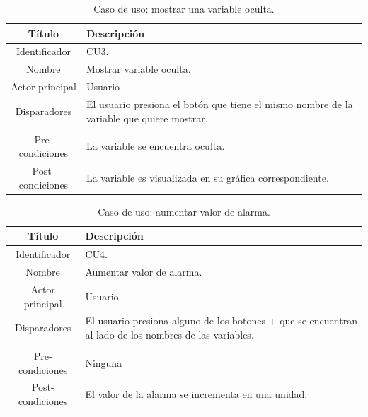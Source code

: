 \begin{table}[htpb]
	\centering
	\caption{Caso de uso: mostrar una variable oculta.}
	\centering
	\begin{tabular}{c p{}}    
		\toprule
		\textbf{Título }     & \textbf{Descripción} \\
		\midrule
		Identificador		&	CU3. \\
		Nombre				& 	Mostrar variable oculta. \\
		Actor principal		&   Usuario \\
		Disparadores		&   El usuario presiona el botón que tiene el mismo nombre de la variable que quiere mostrar. \\
\\
		Pre-condiciones		&   La variable se encuentra oculta. \\
		Post-condiciones	&   La variable es visualizada en su gráfica correspondiente.\\
		\bottomrule
	\end{tabular}
\label{tab:caso-mostrar}
\end{table}

\begin{table}[htpb]
	\centering
	\caption{Caso de uso: aumentar valor de alarma.}
	\centering
	\begin{tabular}{c p{}}    
		\toprule
		\textbf{Título }     & \textbf{Descripción} \\
		\midrule
		Identificador		&	CU4. \\
		Nombre				& 	Aumentar valor de alarma. \\
		Actor principal		&   Usuario \\
		Disparadores		&   El usuario presiona alguno de los botones + que se encuentran al lado de los nombres de las variables. \\
\\
		Pre-condiciones		&   Ninguna \\
		Post-condiciones	&   El valor de la alarma se incrementa en una unidad.\\
		\bottomrule
	\end{tabular}
\label{tab:caso-aumentar}
\end{table}

